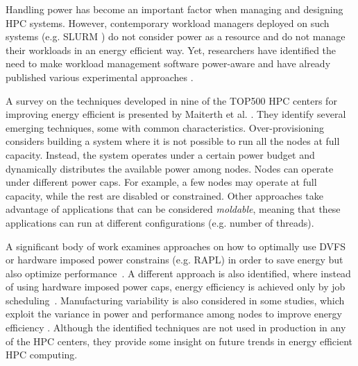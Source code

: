 
Handling power has become an important factor when managing and designing HPC
systems.  However, contemporary workload managers deployed on such systems (e.g. SLURM \cite{slurm_02})
 do not consider power as a resource and do not
manage their workloads in an energy efficient way.  Yet, researchers have
identified the need to make workload management software power-aware and have
already published various experimental approaches 
\cite{Sarood:2014:MTO:2683593.2683682,932708,Etinski2010,Etinski2012615,10.1007/978-3-319-07518-1_25,1559953,8081827,KHEMKA201514,8081827,LEAL201633,Patki:2015:PRM:2749246.2749262}.

A survey on the techniques developed in nine of the TOP500 HPC centers for improving energy
efficient is presented by Maiterth et al. \cite{8425478}.  They identify several emerging
techniques, some with common characteristics.  Over-provisioning
\cite{Sarood:2014:MTO:2683593.2683682} considers building a system where it is not
possible to run all the nodes at full capacity.  Instead, the system operates under a
certain power budget and dynamically distributes the available power among nodes.  Nodes can
operate under different power caps.  For example, a few nodes may operate at full capacity, while
the rest are disabled or constrained.  Other
approaches \cite{932708,Patki:2015:PRM:2749246.2749262} take advantage of applications that
can be considered \emph{moldable}, meaning that these applications can run at different
configurations (e.g. number of threads). 

A significant body of work examines approaches on
how to optimally use DVFS or hardware imposed power constrains (e.g. RAPL) in order to
save energy but also optimize performance~\cite{Etinski2010,Etinski2012615,10.1007/978-3-319-07518-1_25,1559953,8081827,Patki:2015:PRM:2749246.2749262}.
A different approach is also identified, where instead of using hardware imposed power
caps, energy efficiency is achieved only by job scheduling~\cite{KHEMKA201514,8081827,LEAL201633}.  
Manufacturing variability is also considered in
some studies, which exploit the variance in power and performance among nodes to improve
energy efficiency \cite{Patki:2015:PRM:2749246.2749262,ShoukourianPhD}.  Although the
identified techniques are not used in production in any of the HPC centers, they provide some 
insight on future trends in energy efficient HPC computing.

